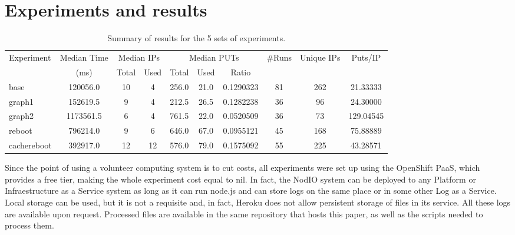 \documentclass[runningheads,a4paper]{llncs}\usepackage[]{graphicx}\usepackage[]{color}
\begin{document}
\section{Experiments and results} 
\label{sec:experiments}

\begin{table}[htb]
\caption{Summary of results for the 5 sets of experiments.\label{tab:runs}}
\begin{center}
\begin{tabular}{|l|c|c|c|c|c|c|c|c|c|}
\hline
Experiment & Median Time & \multicolumn{2}{|c|}{Median IPs} &
\multicolumn{3}{|c|}{Median PUTs} & \#Runs & Unique IPs & Puts/IP \\
           &   (ms)        & Total & Used & Total & Used & Ratio &  & & \\
\hline
base & 120056.0 & 10 & 4 & 256.0 & 21.0 & 0.1290323 & 81 & 262 & 21.33333\\
\hline
graph1 & 152619.5 & 9 & 4 & 212.5 & 26.5 & 0.1282238 & 36 & 96 & 24.30000\\

graph2 & 1173561.5 & 6 & 4 & 761.5 & 22.0 & 0.0520509 & 36 & 73 & 129.04545\\
\hline
reboot & 796214.0 & 9 & 6 & 646.0 & 67.0 & 0.0955121 & 45 & 168 & 75.88889\\
\hline
cachereboot & 392917.0 & 12 & 12 & 576.0 & 79.0 & 0.1575092 & 55 & 225 & 43.28571\\
\hline
\end{tabular}
\end{center}
\end{table}
%
%
%
Since the point of using a volunteer computing system is to cut costs,
all experiments were set up using the OpenShift
PaaS, which provides a free tier, making the whole experiment cost
equal to nil. In fact, the NodIO system can be deployed to any
Platform or Infraestructure as a Service 
system as long as it can run node.js and can store logs on the same
place or in some other Log as a Service. Local storage can be used,
but it is not a requisite and, in fact, Heroku does not allow
persistent storage of files in its service. 
All these logs are available upon
request. Processed files are available in the same repository that
hosts this paper, as well as the scripts needed to process them. 
\end{document}
